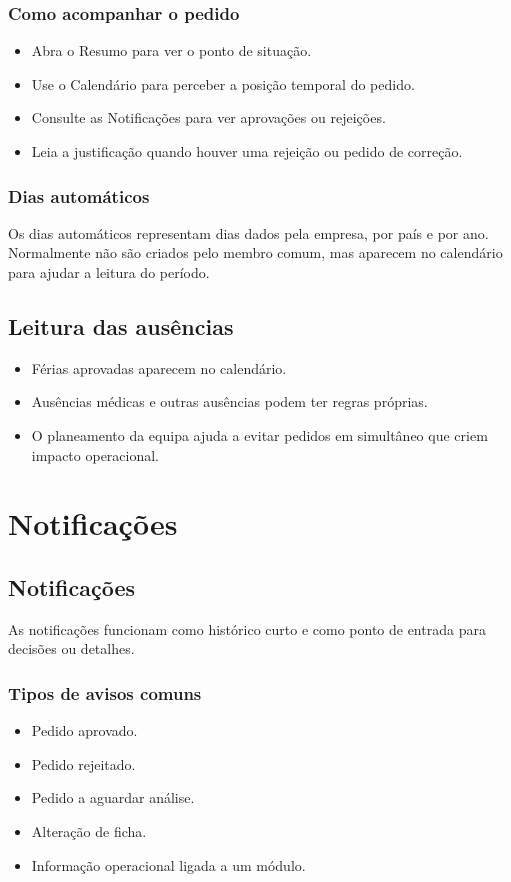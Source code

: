 \subsection{Como acompanhar o pedido}
\begin{itemize}
  \item Abra o Resumo para ver o ponto de situação.
  \item Use o Calendário para perceber a posição temporal do pedido.
  \item Consulte as Notificações para ver aprovações ou rejeições.
  \item Leia a justificação quando houver uma rejeição ou pedido de correção.
\end{itemize}

\subsection{Dias automáticos}
Os dias automáticos representam dias dados pela empresa, por país e por ano. Normalmente não são criados pelo membro comum, mas aparecem no calendário para ajudar a leitura do período.

\section{Leitura das ausências}
\begin{itemize}
  \item Férias aprovadas aparecem no calendário.
  \item Ausências médicas e outras ausências podem ter regras próprias.
  \item O planeamento da equipa ajuda a evitar pedidos em simultâneo que criem impacto operacional.
\end{itemize}

\chapter{Notificações}
\section{Notificações}
As notificações funcionam como histórico curto e como ponto de entrada para decisões ou detalhes.

\subsection{Tipos de avisos comuns}
\begin{itemize}
  \item Pedido aprovado.
  \item Pedido rejeitado.
  \item Pedido a aguardar análise.
  \item Alteração de ficha.
  \item Informação operacional ligada a um módulo.
\end{itemize}

